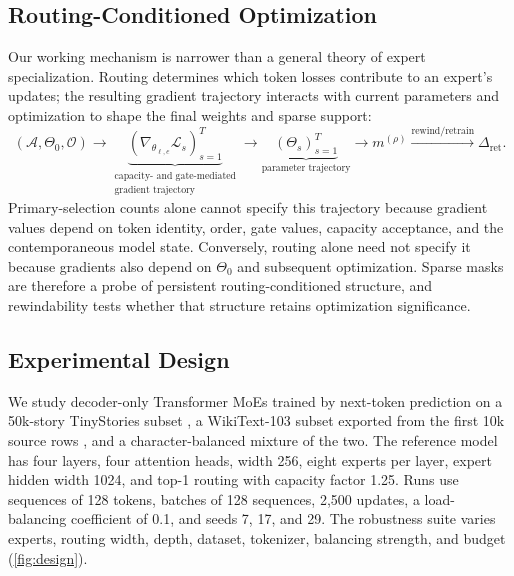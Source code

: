 \documentclass{article}
\begin{document}
\subsection{Routing-Conditioned Optimization}
\label{sec:routing_framework}

Our working mechanism is narrower than a general theory of expert
specialization. Routing determines which token losses contribute to an
expert's updates; the resulting gradient trajectory interacts with current
parameters and optimization to shape the final weights and sparse support:
\begin{equation}
(\mathcal{A},\Theta_0,\mathcal{O})
\longrightarrow
\underbrace{
\left(\nabla_{\theta_{\ell,e}}\mathcal{L}_s\right)_{s=1}^{T}
}_{\substack{\text{capacity- and gate-mediated}\\\text{gradient trajectory}}}
\longrightarrow
\underbrace{
\left(\Theta_s\right)_{s=1}^{T}
}_{\text{parameter trajectory}}
\longrightarrow
m^{(\rho)}
\overset{\text{rewind/retrain}}{\longrightarrow}
\Delta_{\mathrm{ret}}.
\label{eq:mechanistic_chain}
\end{equation}
Primary-selection counts alone cannot specify this trajectory because gradient
values depend on token identity, order, gate values, capacity acceptance, and
the contemporaneous model state. Conversely,
routing alone need not specify it because gradients also depend on $\Theta_0$
and subsequent optimization. Sparse masks are therefore a probe of persistent
routing-conditioned structure, and rewindability tests whether that structure
retains optimization significance.

\subsection{Experimental Design}
\label{sec:experimental_design}

We study decoder-only Transformer MoEs trained by next-token prediction on a
50k-story TinyStories subset \citep{eldan2023tinystories}, a WikiText-103 subset
exported from the first 10k source rows \citep{merity2017pointer}, and a character-balanced mixture
of the two. The reference
model has four layers, four attention heads, width 256, eight experts per layer,
expert hidden width 1024, and top-1 routing with capacity factor 1.25. Runs use
sequences of 128 tokens, batches of 128 sequences, 2,500 updates, a
load-balancing coefficient of 0.1, and seeds 7, 17, and 29. The robustness suite
varies experts, routing width, depth, dataset, tokenizer, balancing strength,
and budget (\cref{fig:design}).
\end{document}
